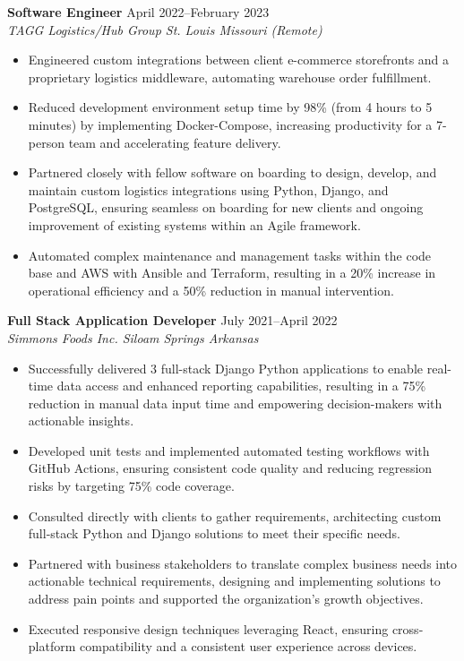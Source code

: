\documentclass[10pt,a4paper]{article}
\begin{document}
\noindent\textbf{Software Engineer} \hfill April 2022--February 2023 \\
\textit{TAGG Logistics/Hub Group \textbar{} St. Louis Missouri (Remote)}
\begin{itemize}[leftmargin=*, noitemsep, topsep=0pt]
    \item Engineered custom integrations between client e-commerce storefronts and a proprietary logistics middleware, automating warehouse order fulfillment.
    \item Reduced development environment setup time by 98\% (from 4 hours to 5 minutes) by implementing Docker-Compose, increasing productivity for a 7-person team and accelerating feature delivery.
    \item Partnered closely with fellow software on boarding to design, develop, and maintain custom logistics integrations using Python, Django, and PostgreSQL, ensuring seamless on boarding for new clients and ongoing improvement of existing systems within an Agile framework.
    \item Automated complex maintenance and management tasks within the code base and AWS with Ansible and Terraform, resulting in a 20\% increase in operational efficiency and a 50\% reduction in manual intervention.
\end{itemize}
\vspace{2mm}

\newpage
\noindent\textbf{Full Stack Application Developer} \hfill July 2021--April 2022 \\
\textit{Simmons Foods Inc. \textbar{} Siloam Springs Arkansas}
\begin{itemize}[leftmargin=*, noitemsep, topsep=0pt]
    \item Successfully delivered 3 full-stack Django Python applications to enable real-time data access and enhanced reporting capabilities, resulting in a 75\% reduction in manual data input time and empowering decision-makers with actionable insights.
    \item Developed unit tests and implemented automated testing workflows with GitHub Actions, ensuring consistent code quality and reducing regression risks by targeting 75\% code coverage.
    \item Consulted directly with clients to gather requirements, architecting custom full-stack Python and Django solutions to meet their specific needs.
    \item Partnered with business stakeholders to translate complex business needs into actionable technical requirements, designing and implementing solutions to address pain points and supported the organization's growth objectives.
    \item Executed responsive design techniques leveraging React, ensuring cross-platform compatibility and a consistent user experience across devices.
\end{itemize}
\vspace{2mm}
\end{document}
